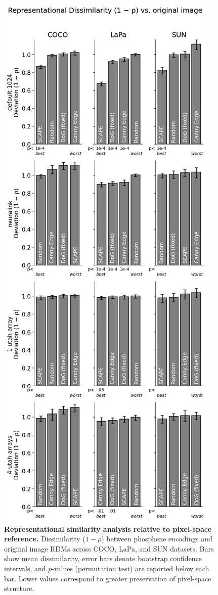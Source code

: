 \begin{figure}[h!]
    \centering
    \includegraphics[width=0.9\columnwidth]{figures/RSA.png}
    \caption{\textbf{Representational similarity analysis relative to pixel-space reference.} 
    Dissimilarity ($1-\rho$) between phosphene encodings and original image RDMs across COCO, LaPa, and SUN datasets. 
    Bars show mean dissimilarity, error bars denote bootstrap confidence intervals, and $p$-values (permutation test) are reported below each bar. 
    Lower values correspond to greater preservation of pixel-space structure.}
    \label{fig:rsa_pixel}
\end{figure}


